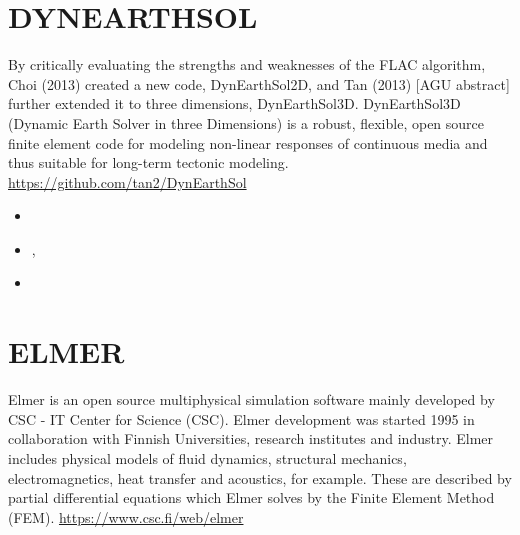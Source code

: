 \section{DYNEARTHSOL} 

By critically evaluating the strengths and weaknesses of the
FLAC algorithm, Choi \etal (2013) created a new code, DynEarthSol2D, 
and Tan \etal (2013) [AGU abstract] further extended it to three
dimensions, DynEarthSol3D. DynEarthSol3D (Dynamic Earth Solver
in three Dimensions) is a robust, flexible, open source finite
element code for modeling non-linear responses of continuous
media and thus suitable for long-term tectonic modeling.
\url{https://github.com/tan2/DynEarthSol}

\begin{small} 
\begin{itemize}
\item[\twothousandthirteen]  \textcite{chtl13}
\item[\twothousandfifteen]   \textcite{jalr15},  \textcite{tact15}
\item[\twothousandseventeen] \textcite{lolc17}
\end{itemize}
\end{small} 


\section{ELMER} 
Elmer is an open source multiphysical simulation software mainly developed by 
CSC - IT Center for Science (CSC). Elmer development was started 1995 
in collaboration with Finnish Universities, research institutes and industry. 
Elmer includes physical models of 
fluid dynamics, structural mechanics, electromagnetics, heat transfer and acoustics, 
for example. These are described by partial differential equations which Elmer solves 
by the Finite Element Method (FEM). \url{https://www.csc.fi/web/elmer}

